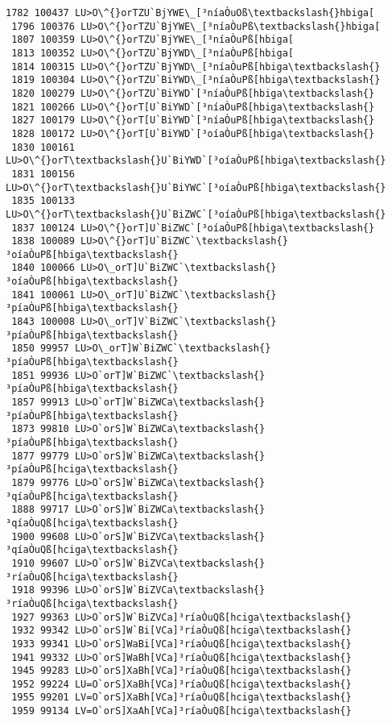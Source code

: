 \documentclass[11pt]{article}
\begin{document}
\begin{Verbatim}[commandchars=\\\{\}]
 1782 100437 LU>O\^{}orTZU`BjYWE\_[³níaÒuOß\textbackslash{}hbiga[
 1796 100376 LU>O\^{}orTZU`BjYWE\_[³níaÒuPß\textbackslash{}hbiga[
 1807 100359 LU>O\^{}orTZU`BjYWE\_[³níaÒuPß[hbiga[
 1813 100352 LU>O\^{}orTZU`BjYWD\_[³níaÒuPß[hbiga[
 1814 100315 LU>O\^{}orTZU`BjYWD\_[³níaÒuPß[hbiga\textbackslash{}
 1819 100304 LU>O\^{}orTZU`BiYWD\_[³níaÒuPß[hbiga\textbackslash{}
 1820 100279 LU>O\^{}orTZU`BiYWD`[³níaÒuPß[hbiga\textbackslash{}
 1821 100266 LU>O\^{}orT[U`BiYWD`[³níaÒuPß[hbiga\textbackslash{}
 1827 100179 LU>O\^{}orT[U`BiYWD`[³níaÒuPß[hbiga\textbackslash{}
 1828 100172 LU>O\^{}orT[U`BiYWD`[³oíaÒuPß[hbiga\textbackslash{}
 1830 100161 LU>O\^{}orT\textbackslash{}U`BiYWD`[³oíaÒuPß[hbiga\textbackslash{}
 1831 100156 LU>O\^{}orT\textbackslash{}U`BiYWC`[³oíaÒuPß[hbiga\textbackslash{}
 1835 100133 LU>O\^{}orT\textbackslash{}U`BiZWC`[³oíaÒuPß[hbiga\textbackslash{}
 1837 100124 LU>O\^{}orT]U`BiZWC`[³oíaÒuPß[hbiga\textbackslash{}
 1838 100089 LU>O\^{}orT]U`BiZWC`\textbackslash{}³oíaÒuPß[hbiga\textbackslash{}
 1840 100066 LU>O\_orT]U`BiZWC`\textbackslash{}³oíaÒuPß[hbiga\textbackslash{}
 1841 100061 LU>O\_orT]U`BiZWC`\textbackslash{}³píaÒuPß[hbiga\textbackslash{}
 1843 100008 LU>O\_orT]V`BiZWC`\textbackslash{}³píaÒuPß[hbiga\textbackslash{}
 1850 99957 LU>O\_orT]W`BiZWC`\textbackslash{}³píaÒuPß[hbiga\textbackslash{}
 1851 99936 LU>O`orT]W`BiZWC`\textbackslash{}³píaÒuPß[hbiga\textbackslash{}
 1857 99913 LU>O`orT]W`BiZWCa\textbackslash{}³píaÒuPß[hbiga\textbackslash{}
 1873 99810 LU>O`orS]W`BiZWCa\textbackslash{}³píaÒuPß[hbiga\textbackslash{}
 1877 99779 LU>O`orS]W`BiZWCa\textbackslash{}³píaÒuPß[hciga\textbackslash{}
 1879 99776 LU>O`orS]W`BiZWCa\textbackslash{}³qíaÒuPß[hciga\textbackslash{}
 1888 99717 LU>O`orS]W`BiZWCa\textbackslash{}³qíaÒuQß[hciga\textbackslash{}
 1900 99608 LU>O`orS]W`BiZVCa\textbackslash{}³qíaÒuQß[hciga\textbackslash{}
 1910 99607 LU>O`orS]W`BiZVCa\textbackslash{}³ríaÒuQß[hciga\textbackslash{}
 1918 99396 LU>O`orS]W`BiZVCa\textbackslash{}³ríaÒuQß[hciga\textbackslash{}
 1927 99363 LU>O`orS]W`BiZVCa]³ríaÒuQß[hciga\textbackslash{}
 1932 99342 LU>O`orS]W`Bi[VCa]³ríaÒuQß[hciga\textbackslash{}
 1933 99341 LU>O`orS]WaBi[VCa]³ríaÒuQß[hciga\textbackslash{}
 1941 99332 LU>O`orS]WaBh[VCa]³ríaÒuQß[hciga\textbackslash{}
 1945 99283 LU>O`orS]XaBh[VCa]³ríaÒuQß[hciga\textbackslash{}
 1952 99224 LU=O`orS]XaBh[VCa]³ríaÒuQß[hciga\textbackslash{}
 1955 99201 LV=O`orS]XaBh[VCa]³ríaÒuQß[hciga\textbackslash{}
 1959 99134 LV=O`orS]XaAh[VCa]³ríaÒuQß[hciga\textbackslash{}

\end{Verbatim}
\end{document}

